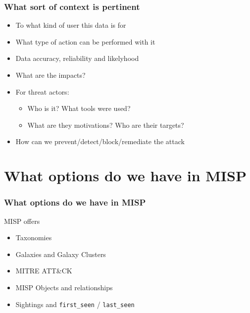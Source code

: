 \begin{frame}
    \frametitle{What sort of context is pertinent}
    \begin{itemize}
        \item To what kind of user this data is for
        \item What type of action can be performed with it 
        \item Data accuracy, reliability and likelyhood
        \item What are the impacts?
        \item For threat actors:
        \begin{itemize}
            \item Who is it? What tools were used?
            \item What are they motivations? Who are their targets?
        \end{itemize}
        \item How can we prevent/detect/block/remediate the attack
    \end{itemize}
\end{frame}

\section{What options do we have in MISP}
\begin{frame}
    \frametitle{What options do we have in MISP}
    MISP offers
    \begin{itemize}
        \item Taxonomies
        \item Galaxies and Galaxy Clusters
        \item MITRE ATT\&CK
        \item MISP Objects and relationships
        \item Sightings and \texttt{first\_seen} / \texttt{last\_seen}
    \end{itemize}
\end{frame}

